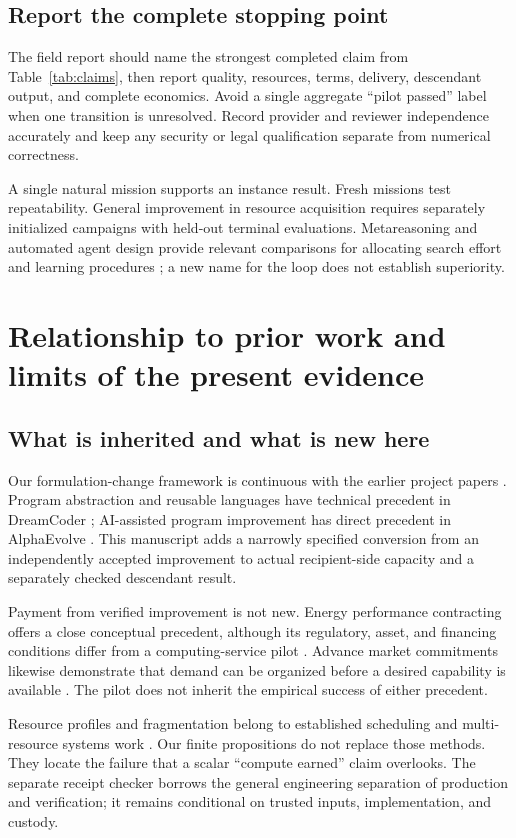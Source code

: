 \documentclass[11pt,letterpaper]{article}
\theoremstyle{remark}\newtheorem{remark}{Remark}[section]
\begin{document}
\subsection{Report the complete stopping point}
The field report should name the strongest completed claim from Table~\ref{tab:claims}, then report quality, resources, terms, delivery, descendant output, and complete economics. Avoid a single aggregate ``pilot passed'' label when one transition is unresolved. Record provider and reviewer independence accurately and keep any security or legal qualification separate from numerical correctness.

A single natural mission supports an instance result. Fresh missions test repeatability. General improvement in resource acquisition requires separately initialized campaigns with held-out terminal evaluations. Metareasoning and automated agent design provide relevant comparisons for allocating search effort and learning procedures \citep{hay,adas}; a new name for the loop does not establish superiority.

\section{Relationship to prior work and limits of the present evidence}
\subsection{What is inherited and what is new here}
Our formulation-change framework is continuous with the earlier project papers \citep{boucherOriginal,boucherProduction}. Program abstraction and reusable languages have technical precedent in DreamCoder \citep{dreamcoder}; AI-assisted program improvement has direct precedent in AlphaEvolve \citep{alphaevolve}. This manuscript adds a narrowly specified conversion from an independently accepted improvement to actual recipient-side capacity and a separately checked descendant result.

Payment from verified improvement is not new. Energy performance contracting offers a close conceptual precedent, although its regulatory, asset, and financing conditions differ from a computing-service pilot \citep{doeContract,doeMV}. Advance market commitments likewise demonstrate that demand can be organized before a desired capability is available \citep{amc}. The pilot does not inherit the empirical success of either precedent.

Resource profiles and fragmentation belong to established scheduling and multi-resource systems work \citep{ghodsi,borg}. Our finite propositions do not replace those methods. They locate the failure that a scalar ``compute earned'' claim overlooks. The separate receipt checker borrows the general engineering separation of production and verification; it remains conditional on trusted inputs, implementation, and custody.
\end{document}
